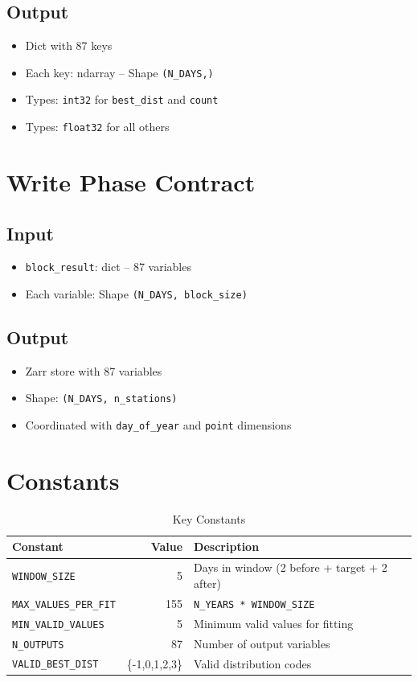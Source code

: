 ﻿\documentclass[12pt,a4paper]{report}
\begin{document}
\subsection{Output}
\begin{itemize}[leftmargin=*]
    \item Dict with 87 keys
    \item Each key: ndarray – Shape \texttt{(N\_DAYS,)}
    \item Types: \texttt{int32} for \texttt{best\_dist} and \texttt{count}
    \item Types: \texttt{float32} for all others
\end{itemize}

\section{Write Phase Contract}
\subsection{Input}
\begin{itemize}[leftmargin=*]
    \item \texttt{block\_result}: dict – 87 variables
    \item Each variable: Shape \texttt{(N\_DAYS, block\_size)}
\end{itemize}
\subsection{Output}
\begin{itemize}[leftmargin=*]
    \item Zarr store with 87 variables
    \item Shape: \texttt{(N\_DAYS, n\_stations)}
    \item Coordinated with \texttt{day\_of\_year} and \texttt{point} dimensions
\end{itemize}

\section{Constants}
\begin{table}[H]
    \centering
    \caption{Key Constants}
    \begin{tabular}{l r l}
        \toprule
        \textbf{Constant} & \textbf{Value} & \textbf{Description} \\
        \midrule
        \texttt{WINDOW\_SIZE} & 5 & Days in window (2 before + target + 2 after) \\
        \texttt{MAX\_VALUES\_PER\_FIT} & 155 & \texttt{N\_YEARS * WINDOW\_SIZE} \\
        \texttt{MIN\_VALID\_VALUES} & 5 & Minimum valid values for fitting \\
        \texttt{N\_OUTPUTS} & 87 & Number of output variables \\
        \texttt{VALID\_BEST\_DIST} & \{-1,0,1,2,3\} & Valid distribution codes \\
        \bottomrule
    \end{tabular}
\end{table}
\end{document}
